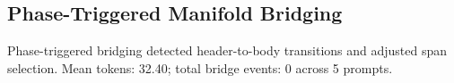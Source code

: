 \subsection{Phase-Triggered Manifold Bridging}
Phase-triggered bridging detected header-to-body transitions and adjusted span selection.
Mean tokens: 32.40; total bridge events: 0 across 5 prompts.
